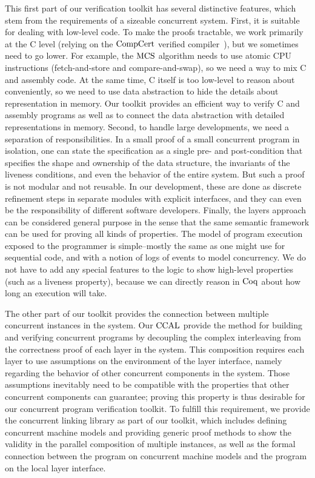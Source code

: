 This first part of our verification toolkit has several distinctive features, which stem from the requirements of a sizeable concurrent system. 
First, it is suitable for dealing with low-level code.
To make the proofs tractable, we work primarily at the C level (relying on the $\mathrm{CompCert}$ verified compiler~\cite{compcert}), 
but we sometimes need to go lower. For example, the $\mathrm{MCS}$ algorithm needs to use atomic CPU instructions (fetch-and-store and compare-and-swap), 
so we need a way to mix C and assembly code. 
At the same time, C itself is too low-level to reason about conveniently, 
so we need to use data abstraction to hide the details about representation in memory. 
Our toolkit provides an efficient way to verify C and assembly programs as well as to connect the data abstraction with detailed representations in memory. 
Second, to handle large developments, we need a separation of responsibilities. 
In a small proof of a small concurrent program in isolation, one can state the specification as a single pre- and post-condition that specifies the shape and ownership of the data structure, 
the invariants of the liveness conditions, and even the behavior of the entire system. 
But such a proof is not modular and not reusable. 
In our development, these are done as discrete refinement steps in separate modules with explicit interfaces, and they can even be the responsibility of different software developers. 
Finally, the layers approach can be considered general purpose in the sense that the same semantic framework can be used for proving all kinds of properties. 
The model of program execution exposed to the programmer is simple--mostly the same as one might use for sequential code, and with a notion of logs of events to model concurrency. 
We do not have to add any special features to the logic to show high-level properties (such as a liveness property), because we can directly reason in $\mathrm{Coq}$ about how long an execution will take. 
 
The other part of our toolkit provides the connection between multiple concurrent instances in the system. 
Our $\mathrm{CCAL}$ provide the method for building and verifying concurrent programs by decoupling the complex interleaving from the correctness proof of each layer in the system. 
This composition requires each layer to use assumptions on the environment of the layer interface, 
namely regarding the behavior of other concurrent components in the system. 
Those assumptions inevitably need to be compatible with the properties that other concurrent components can guarantee; 
proving this property is thus desirable for our concurrent program verification toolkit. 
To fulfill this requirement, we provide the concurrent linking library as part of our toolkit, 
which includes defining concurrent machine models and providing generic proof methods to show the validity in the parallel composition of multiple instances, 
as well as the formal connection between the program on concurrent machine models and the program on the local layer interface. 

